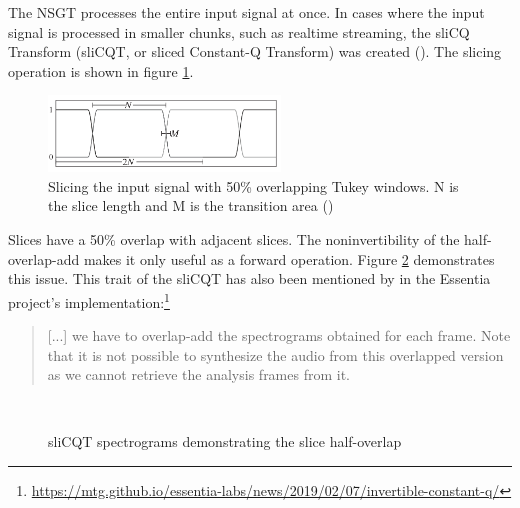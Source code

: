 \documentclass[report.tex]{subfiles}
\begin{document}
The NSGT processes the entire input signal at once. In cases where the input signal is processed in smaller chunks, such as realtime streaming, the sliCQ Transform (sliCQT, or sliced Constant-Q Transform) was created (\cite{invertiblecqt, slicq}). The slicing operation is shown in figure \ref{fig:slicqtukeys}.

\begin{figure}[ht]
	\centering
	\includegraphics[width=0.55\textwidth]{./images-misc/slicq_windows.png}
	\caption{Slicing the input signal with 50\% overlapping Tukey windows. N is the slice length and M is the transition area (\cite{slicq})}
	\label{fig:slicqtukeys}
\end{figure}

Slices have a 50\% overlap with adjacent slices. The noninvertibility of the half-overlap-add makes it only useful as a forward operation. Figure \ref{fig:slicqoverlaps} demonstrates this issue. This trait of the sliCQT has also been mentioned by in the Essentia project's implementation:\footnote{\url{https://mtg.github.io/essentia-labs/news/2019/02/07/invertible-constant-q/}}

\begin{quote}
	[...] we have to overlap-add the spectrograms obtained for each frame. Note that it is not possible to synthesize the audio from this overlapped version as we cannot retrieve the analysis frames from it.
\end{quote}

\begin{figure}[ht]
	\centering
	\\
	\caption{sliCQT spectrograms demonstrating the slice half-overlap}
	\label{fig:slicqoverlaps}
\end{figure}
\end{document}
